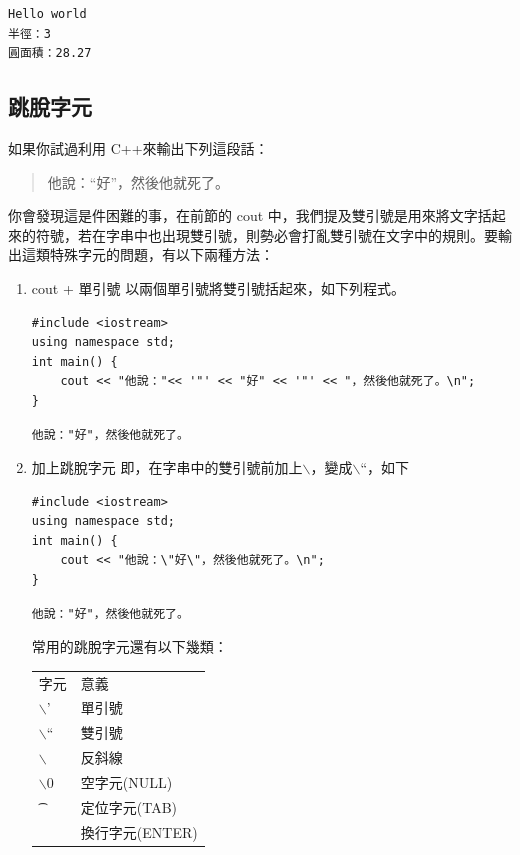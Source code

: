 \documentclass[a4paper,12pt]{article}
\begin{document}
\begin{verbatim}
Hello world
半徑：3
圓面積：28.27
\end{verbatim}

\subsection{跳脫字元}
\label{sec:orgcf4d68d}
如果你試過利用 C++來輸出下列這段話：\\
\begin{verse}
他說：``好''，然後他就死了。\\
\end{verse}
你會發現這是件困難的事，在前節的 cout 中，我們提及雙引號是用來將文字括起來的符號，若在字串中也出現雙引號，則勢必會打亂雙引號在文字中的規則。要輸出這類特殊字元的問題，有以下兩種方法：\\
\begin{enumerate}
\item cout + 單引號
\label{sec:org54501d7}
以兩個單引號將雙引號括起來，如下列程式。\\
\lstset{breaklines=true,language=cpp,label= ,caption= ,captionpos=b,firstnumber=1,numbers=left}
\begin{lstlisting}
#include <iostream>
using namespace std;
int main() {
    cout << "他說："<< '"' << "好" << '"' << "，然後他就死了。\n";
}
\end{lstlisting}

\begin{verbatim}
他說："好"，然後他就死了。
\end{verbatim}
\item 加上跳脫字元
\label{sec:org6901250}
即，在字串中的雙引號前加上$\backslash$，變成$\backslash$``，如下\\
\lstset{breaklines=true,language=cpp,label= ,caption= ,captionpos=b,firstnumber=1,numbers=left}
\begin{lstlisting}
#include <iostream>
using namespace std;
int main() {
    cout << "他說：\"好\"，然後他就死了。\n";
}
\end{lstlisting}

\begin{verbatim}
他說："好"，然後他就死了。
\end{verbatim}


常用的跳脫字元還有以下幾類：\\
\begin{center}
\begin{tabular}{ll}
字元 & 意義\\
$\backslash$' & 單引號\\
$\backslash$`` & 雙引號\\
$\backslash$\ & 反斜線\\
$\backslash$0 & 空字元(NULL)\\
\t & 定位字元(TAB)\\
\n & 換行字元(ENTER)\\
\end{tabular}
\end{center}
\end{enumerate}
\end{document}
